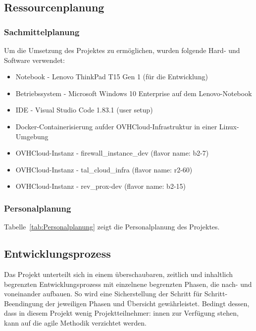 \subsection{Ressourcenplanung}
\label{sec:Ressourcenplanung}

\subsubsection{Sachmittelplanung}
\label{sec:Sachmittelplanung}
Um die Umsetzung des Projektes zu ermöglichen, wurden folgende Hard- und Software verwendet:
\begin{itemize}
	\item Notebook - Lenovo ThinkPad T15 Gen 1 (für die Entwicklung)
	\item Betriebssystem - Microsoft Windows 10 Enterprise auf dem Lenovo-Notebook
	\item IDE - Visual Studio Code 1.83.1 (user setup)
	\item Docker-Containerisierung aufder OVHCloud-Infrastruktur in einer Linux-Umgebung
	\item OVHCloud-Instanz - firewall\_instance\_dev (flavor name: b2-7)
	\item OVHCloud-Instanz - tal\_cloud\_infra (flavor name: r2-60)
	\item OVHCloud-Instanz - rev\_prox-dev (flavor name: b2-15)
\end{itemize}

\subsubsection{Personalplanung}
\label{sec:Personalplanung}
Tabelle~\ref{tab:Personalplanung} zeigt die Personalplanung des Projektes.

\subsection{Entwicklungsprozess}
\label{sec:Entwicklungsprozess}
Das Projekt unterteilt sich in einem überschaubaren, zeitlich und inhaltlich begrenzten Entwicklungsprozess 
mit einzelnene begrenzten Phasen, die nach- und voneinander aufbauen. So wird eine Sicherstellung der Schritt 
für Schritt-Beendingung der jeweiligen Phasen und Übersicht gewährleistet. Bedingt dessen, dass in diesem Projekt 
wenig Projektteilnehmer: innen zur Verfügung stehen, kann auf die agile Methodik verzichtet werden.

